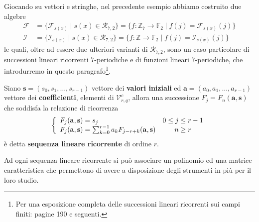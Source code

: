 Giocando su vettori e stringhe, nel precedente esempio abbiamo costruito due algebre
   \begin{align*}
      \mathscr{F} &= \lbrace  \mathscr{F}_{s(x)} \mid s(x) \in \mathcal{R}_{7,2} \rbrace 
                = \lbrace f:\mathbb{Z}_{7}\rightarrow\mathbb{F}_{2} \mid f(j)=\mathscr{F}_{s(x)}(j) \rbrace
      \\ 
      \mathscr{I} &= \lbrace  \mathscr{I}_{s(x)} \mid s(x) \in \mathcal{R}_{7,2} \rbrace 
           =\lbrace f:\mathbb{Z} \rightarrow  \mathbb{F}_{2} \mid f(j) = \mathscr{I}_{s(x)}(j) \rbrace
   \end{align*}
le quali, oltre ad essere due ulteriori varianti di $\mathcal{R}_{7,2}$, sono un caso particolare di successioni lineari ricorrenti $7$-periodiche e di funzioni lineari $7$-periodiche, che introdurremo in questo paragrafo\footnote{Per una esposizione completa delle successioni lineari ricorrenti sui campi finiti: \cite{lidl} pagine 190 e seguenti.}. 
\begin{definizione}
   Siano $\mathbf{s} = (s_0, s_1, \dots , s_{r-1})$ vettore dei {\bf valori iniziali} ed $\mathbf{a} = (a_0, a_1, \dots , a_{r-1})$ vettore dei {\bf coefficienti}, elementi di $\mathcal{V}_{r, q}^{c}$, allora una successione $F_{j} = F_{n}(\mathbf{a},\mathbf{s})$ che soddisfa la relazione di ricorrenza
   \begin{displaymath}
     \left\{ 
     \begin{array}{l c} 
     F_{j}(\mathbf{a},\mathbf{s}) = s_{j} & 0 \leq j \leq r-1 \\
      F_{j}(\mathbf{a},\mathbf{s}) = \sum_{k=0}^{r-1} a_{k} F_{j-r+k}(\mathbf{a},\mathbf{s})  & n \geq r 
     \end{array}
     \right.
     \end{displaymath}
   è detta {\bf sequenza lineare ricorrente} di ordine $r$.
\end{definizione}
Ad ogni sequenza lineare ricorrente si può associare un polinomio ed una matrice caratteristica che permettono di avere a disposizione degli strumenti in più per il loro studio.
